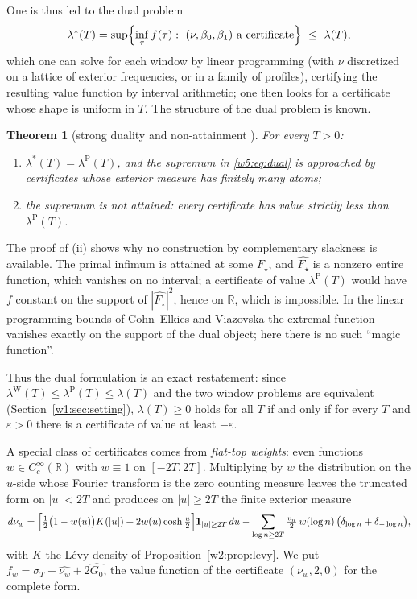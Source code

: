 \documentclass[11pt]{amsart}
\newtheorem{theorem}{Theorem}[section]
\theoremstyle{definition}
\theoremstyle{remark}
\numberwithin{equation}{section}
\newcommand{\R}{\mathbb{R}}
\newcommand{\sT}{\sigma_T}                             %
\newcommand{\lam}{\lambda(T)}                          %
\newcommand{\lamW}{\lambda^{\mathrm W}(T)}             %
\begin{document}
One is thus led to the dual problem
\begin{equation}\label{w5:eq:dual}
  \lambda^{\ast}(T)=\sup\Bigl\{\inf_\tau f(\tau):\ (\nu,\beta_0,\beta_1)\ \text{a certificate}\Bigr\}\ \le\ \lam ,
\end{equation}
which one can solve for each window by linear programming (with $\nu$ discretized on a lattice of exterior
frequencies, or in a family of profiles), certifying the resulting value function by interval arithmetic; one then
looks for a certificate whose shape is uniform in $T$. The structure of the dual problem is known.

\begin{theorem}[strong duality and non-attainment {\cite[Theorems~4.4 and~4.6]{P46}}]\label{w5:obs:strong}
For every $T>0$:
\begin{enumerate}[label=(\roman*)]
\item $\lambda^\ast(T)=\lambda^{\mathrm P}(T)$, and the supremum in \eqref{w5:eq:dual} is approached by certificates
whose exterior measure has finitely many atoms;
\item the supremum is not attained: every certificate has value strictly less than $\lambda^{\mathrm P}(T)$.
\end{enumerate}
\end{theorem}

The proof of (ii) shows why no construction by complementary slackness is available. The primal infimum is attained
at some $F_\star$, and $\widehat{F_\star}$ is a nonzero entire function, which vanishes on no interval; a certificate
of value $\lambda^{\mathrm P}(T)$ would have $f$ constant on the support of $|\widehat{F_\star}|^2$, hence on $\R$, which
is impossible. In the linear programming bounds of Cohn--Elkies and Viazovska \cite{CohnElkies2003,Viazovska2017} the
extremal function vanishes exactly on the support of the dual object; here there is no such ``magic function''.

Thus the dual formulation is an exact restatement: since $\lamW\le\lambda^{\mathrm P}(T)\le\lam$ and the two window
problems are equivalent (Section~\ref{w1:sec:setting}), $\lam\ge0$ holds for all $T$ if and only if for every $T$ and
$\varepsilon>0$ there is a certificate of value at least $-\varepsilon$.

A special class of certificates comes from \emph{flat-top weights}: even functions $w\in C_c^\infty(\R)$ with $w\equiv1$
on $[-2T,2T]$. Multiplying by $w$ the distribution on the $u$-side whose Fourier transform is the zero counting measure
leaves the truncated form on $|u|<2T$ and produces on $|u|\ge2T$ the finite exterior measure
\[
  d\nu_w=\Bigl[\tfrac12\bigl(1-w(u)\bigr)K(|u|)+2w(u)\cosh\tfrac u2\Bigr]\mathbf 1_{|u|\ge2T}\,du
  -\sum_{\log n\ge2T}\tfrac{v_n}2\,w(\log n)\,\bigl(\delta_{\log n}+\delta_{-\log n}\bigr),
\]
with $K$ the L\'evy density of Proposition~\ref{w2:prop:levy}. We put $f_w=\sT+\widehat{\nu_w}+2\widehat{G_0}$, the value
function of the certificate $(\nu_w,2,0)$ for the complete form.
\end{document}
